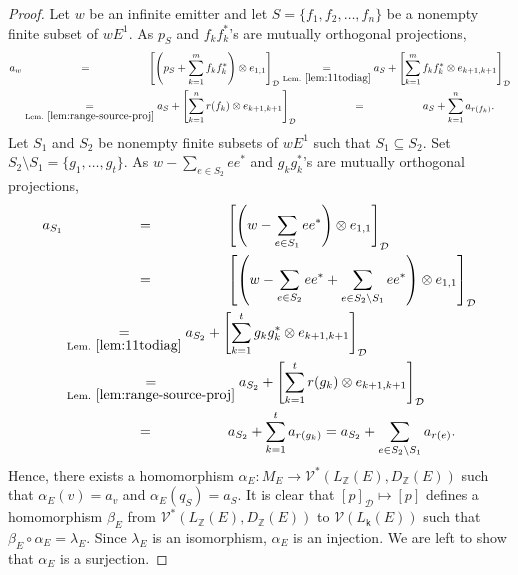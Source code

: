 \documentclass[11pt, letterpaper,final]{amsart}
\newcommand{\ZZ}{\mathbb{Z}}
\newcommand{\V}{\mathcal{V}}
\newcommand{\D}{\mathcal{D}}
\theoremstyle{definition}
\theoremstyle{remark}
\begin{document}
\begin{proof}
Let $w$ be an infinite emitter and let $S = \{ f_1, f_2, \ldots, f_n \}$ be a nonempty finite subset of $wE^1$.  As $p_S$ and $f_k f_k^*$'s are mutually orthogonal projections,   
\begin{align*}
a_w &\underset{\phantom{\text{Lem.}~\ref{lem:diag-proj-graph}}}{=} \left[ \left( p_S + \sum_{k=1}^m f_k f_k^* \right) \otimes e_{1,1} \right]_{ \D } \underset{\text{Lem.}~\ref{lem:11todiag}}{=} a_S + \left[  \sum_{k=1 }^m f_k f_k^* \otimes e_{k+1,k+1} \right]_{ \D } \\
&\underset{\text{Lem.}~\ref{lem:range-source-proj}}{=} a_S + \left[  \sum_{k=1 }^n r(f_k) \otimes e_{k+1,k+1} \right]_{ \D } \underset{\phantom{\text{Lem.}~\ref{lem:diag-proj-graph}}}{=} a_S + \sum_{ k = 1}^n a_{ r(f_k)}.
\end{align*}
Let $S_1$ and $S_2$ be nonempty finite subsets of $wE^1$ such that $S_1 \subseteq S_2$.  Set  $S_2 \setminus S_1 = \{g_1, \ldots, g_t \}$.  As $w - \sum_{ e \in S_2 } e e^*$ and $g_kg_k^*$'s are mutually orthogonal projections,
\begin{align*}
a_{S_1}&\underset{\phantom{\text{Lem.}~\ref{lem:diag-proj-graph}}}{=} \left[ \left(w - \sum_{ e \in S_1 } e e^* \right)\otimes e_{1,1} \right]_{\D} \\
&\underset{\phantom{\text{Lem.}~\ref{lem:diag-proj-graph}}}{=} \left[ \left(w - \sum_{ e \in S_2 } e e^* + \sum_{ e \in S_2 \setminus S_1 }  e e^* \right)\otimes e_{1,1} \right]_{\D} \\
&\underset{\text{Lem.}~\ref{lem:11todiag}}{=}a_{S_2}  + \left[ \sum_{ k = 1 }^t  g_k g_k^* \otimes e_{k+1,k+1} \right]_{\D} \\
&\underset{\text{Lem.}~\ref{lem:range-source-proj}}{=}a_{S_2} + \left[ \sum_{ k = 1 }^t  r(g_k) \otimes e_{k+1,k+1} \right]_{\D} \\
&\underset{\phantom{\text{Lem.}~\ref{lem:diag-proj-graph}}}{=} a_{S_2}+ \sum_{ k = 1}^t  a_{r(g_k)}   = a_{S_2} + \sum_{e \in S_2\setminus S_1} a_{r(e)}.    
\end{align*}
Hence, there exists a homomorphism $\alpha_E \colon M_E \to \V^*( L_\ZZ(E), D_\ZZ(E))$ such that $\alpha_E(v)= a_v$ and $\alpha_E( q_S) =a_S$.  It is clear that $[p]_{\D } \mapsto [p]$ defines a homomorphism $\beta_E$ from $\V^*( L_\ZZ(E), D_\ZZ(E))$ to $\V(L_\mathsf{k}(E))$ such that $\beta_E\circ \alpha_E = \lambda_E$.  Since $\lambda_E$ is an isomorphism, $\alpha_E$ is an injection.  We are left to show that $\alpha_E$ is a surjection.  



\end{proof}
\end{document}
